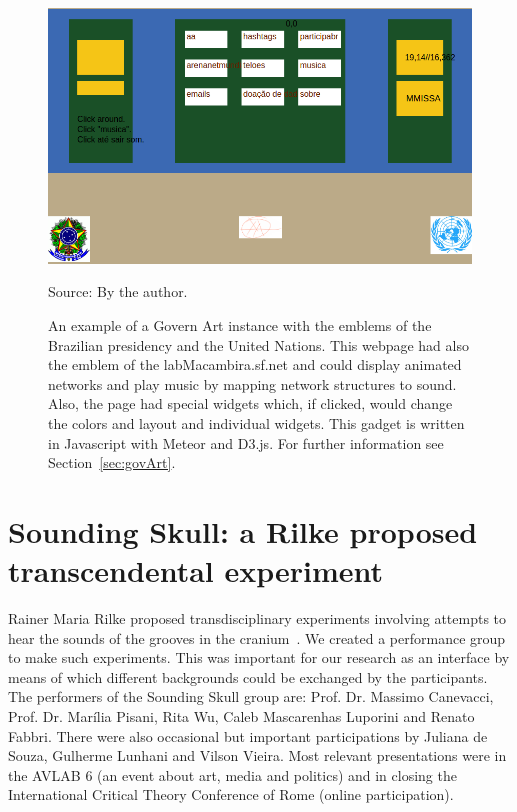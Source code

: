 \begin{apendicesenv}
\begin{figure}[h!]
\begin{center}
\includegraphics[scale=.45]{figs/govArt}
\caption{An example of a Govern Art instance with the emblems of the Brazilian presidency and the United Nations.
	This webpage had also the emblem of the labMacambira.sf.net and could display animated networks and play music by mapping network structures to sound.
	Also, the page had special widgets which, if clicked, would change the colors and layout and individual widgets.
	This gadget is written in Javascript with Meteor and D3.js.
	For further information see Section~\ref{sec:govArt}.}
\label{fig:gart}
\begin{flushleft}\footnotesize
Source: By the author.\
\end{flushleft}
\end{center}
\end{figure}
\section{Sounding Skull: a Rilke proposed transcendental experiment}\label{sec:soundSkull}
Rainer Maria Rilke proposed transdisciplinary experiments involving attempts to hear the
sounds of the grooves in the cranium~\cite{rilke}.
We created a performance group to make such experiments.
This was important for our research as an interface
by means of which different backgrounds could be exchanged by the participants.
The performers of the Sounding Skull group are:
Prof. Dr. Massimo Canevacci, Prof. Dr. Marília Pisani,
Rita Wu, Caleb Mascarenhas Luporini and Renato Fabbri.
There were also occasional but important participations
by Juliana de Souza, Gulherme Lunhani and Vilson Vieira.
Most relevant presentations were in the AVLAB 6 (an event about art, media and politics)
and in closing the International Critical Theory Conference of Rome (online participation).


\end{apendicesenv}

